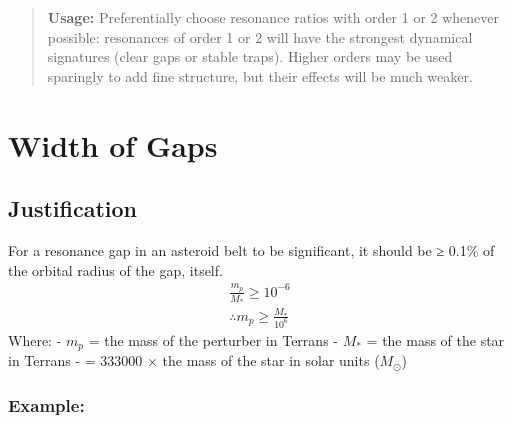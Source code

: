 \documentclass[
  letterpaper,
]{book}
\begin{document}
\begin{quote}
\textbf{Usage:} Preferentially choose resonance ratios with order 1 or 2
whenever possible: resonances of order 1 or 2 will have the strongest
dynamical signatures (clear gaps or stable traps). Higher orders may be
used sparingly to add fine structure, but their effects will be much
weaker.
\end{quote}

\chapter{Width of Gaps}\label{width-of-gaps}

\section{Justification}\label{justification}

For a resonance gap in an asteroid belt to be significant, it should be
≥ 0.1\% of the orbital radius of the gap, itself. \[
\begin{gather}
\frac{m_p}{M_*} \geq 10^{-6} \\
\therefore m_p \geq \frac{M_*}{10^6}
\end{gather}
\] Where: - \(m_{p}\) = the mass of the perturber in Terrans - \(M_*\) =
the mass of the star in Terrans - = 333000 × the mass of the star in
solar units (\(M_\odot\))

\subsection{Example:}\label{example-5}
\end{document}

